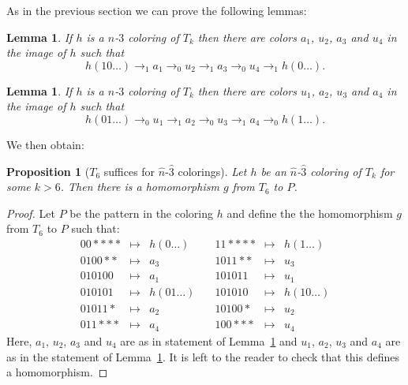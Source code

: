 \documentclass[a4paper]{article}
\newcommand{\any}{{*}}
\newtheorem{lemma}[theorem]{Lemma}
\newtheorem{proposition}[theorem]{Proposition}
\begin{document}
As in the previous section we can prove the following lemmas:
\begin{lemma} \label{three zero}
 If $h$ is a $n$-$3$ coloring of $T_k$ then there are colors $a_1$,
$u_2$, $a_3$ and $u_4$ in the image of $h$ such that
\[
 h(10\dots) \rightarrow_1 a_1 \rightarrow_0 u_2 \rightarrow_1 a_3
\rightarrow_0 u_4 \rightarrow_1 h(0\dots).
\]
\end{lemma}

\begin{lemma} \label{three one}
 If $h$ is a $n$-$3$ coloring of $T_k$ then there are colors $u_1$,
$a_2$, $u_3$ and $a_4$ in the image of $h$ such that
\[
 h(01\dots) \rightarrow_0 u_1 \rightarrow_1 a_2 \rightarrow_0 u_3
\rightarrow_1 a_4 \rightarrow_0 h(1\dots).
\]
\end{lemma}

We then obtain:
\begin{proposition}[$T_6$ suffices for $\hat{n}$-$\hat{3}$ colorings]
 Let $h$ be an $\hat{n}$-$\hat{3}$ coloring of $T_k$ for some $k > 6$. Then
there is a homomorphism $g$ from $T_6$ to $P$.
\end{proposition}
\begin{proof}
Let $P$ be the pattern in the coloring $h$ and define the the
homomorphism $g$ from $T_6$ to $P$ such that:
\[
 \begin{array}{rcl}
 00\any\any\any\any & \mapsto & h(0\dots) \\
 0100\any\any & \mapsto & a_3 \\
 010100 & \mapsto & a_1 \\
 010101 & \mapsto & h(01\dots) \\
 01011\any & \mapsto & a_2 \\
 011\any\any\any & \mapsto & a_4
 \end{array} \quad
 \begin{array}{rcl}
 11\any\any\any\any & \mapsto & h(1\dots) \\
 1011\any\any & \mapsto & u_3 \\
 101011 & \mapsto & u_1 \\
 101010 & \mapsto & h(10\dots) \\
 10100\any & \mapsto & u_2 \\
 100\any\any\any & \mapsto & u_4
 \end{array}
\]
Here, $a_1$, $u_2$, $a_3$ and $u_4$ are as in statement of
Lemma~\ref{three zero} and $u_1$, $a_2$, $u_3$ and $a_4$ are as in the
statement of Lemma~\ref{three one}. It is left to the reader to check
that this defines a homomorphism.
\end{proof}
\end{document}
